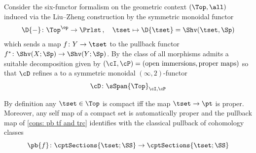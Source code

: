   Consider the six-functor formalism on the geometric context
  $(\Top, \all)$ induced via the
  Liu--Zheng construction by the symmetric monoidal functor
  \[ \D{-}\colon \Top^\op \to \Prlst\,,\quad \tset \mapsto \D{\tset}=\Shv(\tset,\Sp) \]
  which sends a map $f\colon Y\to \tset$ to the pullback functor $f^*\colon\Shv (X;\Sp )\to\Shv (Y;\Sp )$. 
  By  the class of all morphisms admits a suitable decomposition given by
  $(\cI ,\cP ) = (\textrm{open immersions}, \textrm{proper maps})$
  so that $\cD$ refines a to a symmetric monoidal $(\infty,2)$-functor
  \[ \cD\colon \sSpan{\Top}_{\cI,\cP}\]
  

  By definition any $\tset \in \Top$ is compact iff the map $\tset \to \pt$ is
  proper. Moreover, any self map of a compact set is automatically proper
  and the pullback map of \cref{cons: pb tf and trc} 
  identifies with the
  classical pullback of cohomology classes
  \[ \pb{f}\colon \cptSections{\tset;\SS}\to \cptSections{\tset;\SS}\]
  
